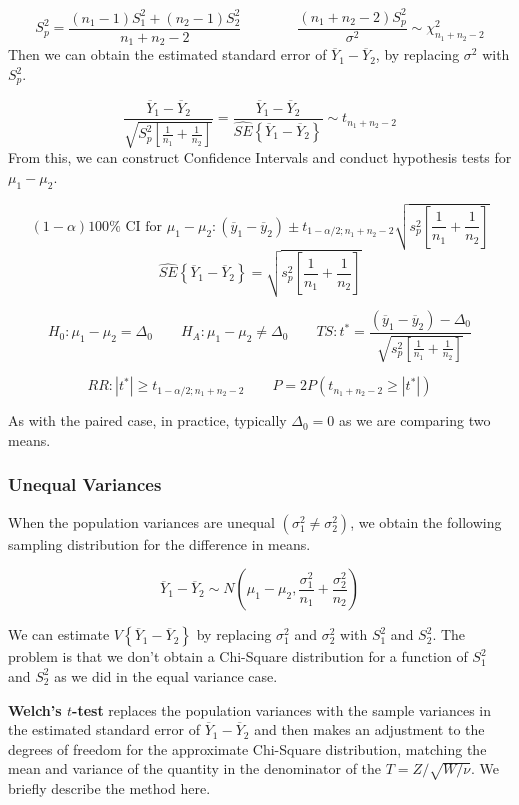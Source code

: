 \documentclass[
]{book}
\begin{document}
\[
S_p^2=\frac{\left(n_1-1\right)S_1^2+\left(n_2-1\right)S_2^2}{n_1+n_2-2} \qquad \qquad
\frac{\left(n_1+n_2-2\right)S_p^2}{\sigma^2} \sim \chi_{n_1+n_2-2}^2
\] Then we can obtain the estimated standard error of
\(\overline{Y}_1 - \overline{Y}_2\), by replacing \(\sigma^2\) with
\(S_p^2\).

\[
\frac{\overline{Y}_1 - \overline{Y}_2}{
\sqrt{S_p^2\left[\frac{1}{n_1}+\frac{1}{n_2}\right]}}=
\frac{\overline{Y}_1 - \overline{Y}_2}{
\hat{SE}\left\{\overline{Y}_1 - \overline{Y}_2\right\}} \sim t_{n_1+n_2-2}
\] From this, we can construct Confidence Intervals and conduct
hypothesis tests for \(\mu_1-\mu_2\).

\[
(1-\alpha)100\% \mbox{ CI for } \mu_1-\mu_2:
\left(\overline{y}_1-\overline{y}_2\right) \pm 
t_{1-\alpha/2;n_1+n_2-2}\sqrt{s_p^2\left[\frac{1}{n_1}+\frac{1}{n_2}\right]}
\] \[
\hat{SE}\left\{\overline{Y}_1-\overline{Y}_2\right\}=
\sqrt{s_p^2\left[\frac{1}{n_1}+\frac{1}{n_2}\right]}
\]

\[
H_0:\mu_1-\mu_2=\Delta_0 \qquad H_A:\mu_1-\mu_2 \neq \Delta_0 \qquad 
TS:t^*=\frac{\left(\overline{y}_1-\overline{y}_2\right)-\Delta_0}{
\sqrt{s_p^2\left[\frac{1}{n_1}+\frac{1}{n_2}\right]}}
\]

\[
RR:|t^*|\geq t_{1-\alpha/2;n_1+n_2-2} 
\qquad P=2P\left(t_{n_1+n_2-2}\geq|t^*|\right)
\]

As with the paired case, in practice, typically \(\Delta_0=0\) as we are
comparing two means.

\subsubsection{Unequal Variances}\label{unequal-variances}

When the population variances are unequal
\(\left(\sigma_1^2\neq\sigma_2^2\right)\), we obtain the following
sampling distribution for the difference in means.

\[
\overline{Y}_1 - \overline{Y}_2 \sim 
N\left(\mu_1-\mu_2,\frac{\sigma^2_1}{n_1}+\frac{\sigma_2^2}{n_2}\right)
\]

We can estimate \(V\left\{\overline{Y}_1 - \overline{Y}_2\right\}\) by
replacing \(\sigma_1^2\) and \(\sigma_2^2\) with \(S_1^2\) and
\(S_2^2\). The problem is that we don't obtain a Chi-Square distribution
for a function of \(S_1^2\) and \(S_2^2\) as we did in the equal
variance case.

\textbf{Welch's \(t\)-test} replaces the population variances with the
sample variances in the estimated standard error of
\(\overline{Y}_1 - \overline{Y}_2\) and then makes an adjustment to the
degrees of freedom for the approximate Chi-Square distribution, matching
the mean and variance of the quantity in the denominator of the
\(T=Z/\sqrt{W/{\nu}}\). We briefly describe the method here.
\end{document}
